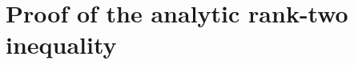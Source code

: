 \documentclass[10pt]{article}
\begin{document}
\appendix
\section{Proof of the analytic rank-two inequality}\label{app:analytic}
\setcounter{equation}{0}
\renewcommand{\theequation}{A\arabic{equation}}

\end{document}

